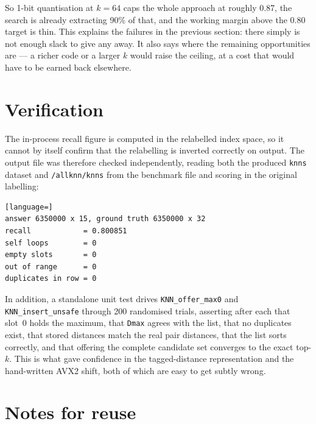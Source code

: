 \documentclass[11pt,a4paper]{article}
\newcommand{\code}[1]{\texttt{\small #1}}
\begin{document}
\begin{center}
\end{center}

\noindent
So 1-bit quantisation at $k = 64$ caps the whole approach at roughly 0.87, the
search is already extracting 90\% of that, and the working margin above the 0.80
target is thin. This explains the failures in the previous section: there simply
is not enough slack to give any away. It also says where the remaining
opportunities are --- a richer code or a larger $k$ would raise the ceiling, at
a cost that would have to be earned back elsewhere.

\section{Verification}

The in-process recall figure is computed in the relabelled index space, so it
cannot by itself confirm that the relabelling is inverted correctly on output.
The output file was therefore checked independently, reading both the produced
\code{knns} dataset and \code{/allknn/knns} from the benchmark file and scoring
in the original labelling:

\begin{lstlisting}[language=]
answer 6350000 x 15, ground truth 6350000 x 32
recall            = 0.800851
self loops        = 0
empty slots       = 0
out of range      = 0
duplicates in row = 0
\end{lstlisting}

\noindent
In addition, a standalone unit test drives \code{KNN\_offer\_max0} and
\code{KNN\_insert\_unsafe} through 200 randomised trials, asserting after each
that slot~0 holds the maximum, that \code{Dmax} agrees with the list, that no
duplicates exist, that stored distances match the real pair distances, that the
list sorts correctly, and that offering the complete candidate set converges to
the exact top-$k$. This is what gave confidence in the tagged-distance
representation and the hand-written AVX2 shift, both of which are easy to get
subtly wrong.

\section{Notes for reuse}
\end{document}
